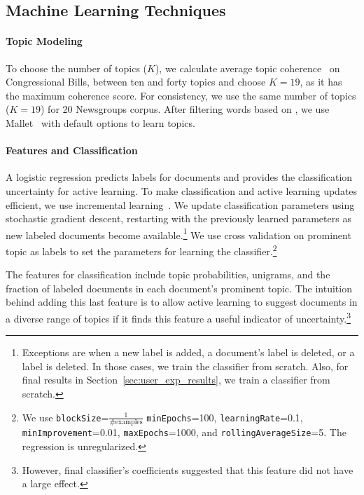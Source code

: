 \subsection{Machine Learning Techniques}

\paragraph{Topic Modeling}

To choose the number of topics ($K$), we calculate average topic
coherence~\cite{lau-tealeaves-14} on  Congressional Bills, between ten and
forty topics and choose $K=19$, as it has the maximum coherence
score.  For consistency, we use the same number of topics ($K=19$) for 20 Newsgroups corpus. After filtering words based on , we use
Mallet~\cite{mallet} with default options to learn topics. 



\paragraph{Features and Classification}





A logistic regression
predicts labels for documents and provides the classification uncertainty for
active learning.  To make classification and active learning updates efficient,
we use incremental learning~\cite[LingPipe]{lingpipe}. We update classification parameters
using stochastic gradient descent, restarting with the previously learned
parameters as new labeled documents become available.\footnote{Exceptions are
  when a new label is added, a document's label is deleted, or a label is
  deleted. In those cases, we train the classifier from scratch. Also, for final
  results in Section~\ref{sec:user_exp_results}, we train a classifier from
  scratch.}  We use cross validation on prominent topic as labels to set the parameters for
learning the classifier.\footnote{We use
  \texttt{blockSize}=$\frac{1}{\#\mbox{examples}}$ \texttt{minEpochs}=100,
  \texttt{learningRate}=0.1, \texttt{minImprovement}=0.01,
  \texttt{maxEpochs}=1000, and \texttt{rollingAverageSize}=5. The regression is unregularized.}

The features for classification include topic probabilities, unigrams,
and the fraction of labeled documents in each document's prominent
topic. The intuition behind adding this last feature is to allow
active learning to suggest documents in a diverse range of topics if
it finds this feature a useful indicator of
uncertainty.\footnote{However, final classifier's coefficients suggested that this feature did not have a large
  effect.}










